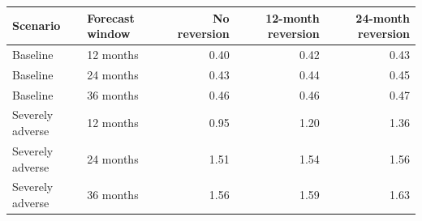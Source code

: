 \begin{tabular}{llrrr}
\toprule
Scenario & Forecast window & No reversion & 12-month reversion & 24-month reversion \\
\midrule
Baseline & 12 months & 0.40 & 0.42 & 0.43 \\
Baseline & 24 months & 0.43 & 0.44 & 0.45 \\
Baseline & 36 months & 0.46 & 0.46 & 0.47 \\
\midrule
Severely adverse & 12 months & 0.95 & 1.20 & 1.36 \\
Severely adverse & 24 months & 1.51 & 1.54 & 1.56 \\
Severely adverse & 36 months & 1.56 & 1.59 & 1.63 \\
\bottomrule
\end{tabular}
